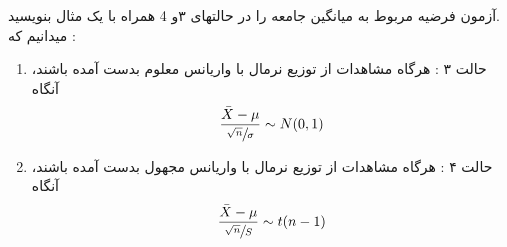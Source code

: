 \documentclass[persian]{KNED}
\begin{document}
\begin{exercise}
آزمون فرضیه مربوط به میانگین جامعه را در حالتهای ۳و 4 همراه
با یک مثال بنویسید.\\
میدانیم که : 
\begin{enumerate}
    \item  حالت ۳ : هرگاه مشاهدات از توزیع نرمال با واریانس معلوم بدست آمده باشند، آنگاه
    \[
        \frac{\Bar{X} - \mu }{\sfrac{\sqrt{n}}{\sigma}} \sim N(0, 1)
    \]
    \item حالت ۴ : هرگاه مشاهدات از توزیع نرمال با واریانس مجهول بدست آمده باشند، آنگاه
    \[
        \frac{\Bar{X} - \mu }{\sfrac{\sqrt{n}}{S}} \sim t(n-1)
    \]

\end{enumerate}

\end{exercise}
\end{document}

